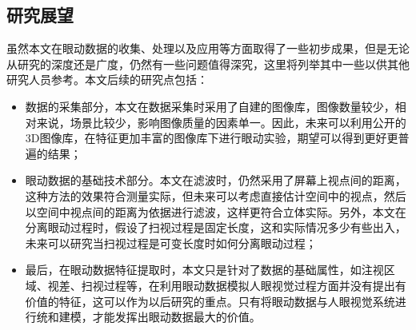 \begin{summary}
\section{研究展望}
虽然本文在眼动数据的收集、处理以及应用等方面取得了一些初步成果，但是无论从研究的深度还是广度，仍然有一些问题值得深究，这里将列举其中一些以供其他研究人员参考。本文后续的研究点包括：
\begin{itemize}[noitemsep,topsep=0pt,parsep=0pt,partopsep=0pt]
\item 数据的采集部分，本文在数据采集时采用了自建的图像库，图像数量较少，相对来说，场景比较少，影响图像质量的因素单一。因此，未来可以利用公开的3D图像库，在特征更加丰富的图像库下进行眼动实验，期望可以得到更好更普遍的结果；
\item 眼动数据的基础技术部分。本文在滤波时，仍然采用了屏幕上视点间的距离，这种方法的效果符合测量实际，但未来可以考虑直接估计空间中的视点，然后以空间中视点间的距离为依据进行滤波，这样更符合立体实际。另外，本文在分离眼动过程时，假设了扫视过程是固定长度，这和实际情况多少有些出入，未来可以研究当扫视过程是可变长度时如何分离眼动过程；
\item 最后，在眼动数据特征提取时，本文只是针对了数据的基础属性，如注视区域、视差、扫视过程等，在利用眼动数据模拟人眼视觉过程方面并没有提出有价值的特征，这可以作为以后研究的重点。只有将眼动数据与人眼视觉系统进行统和建模，才能发挥出眼动数据最大的价值。
\end{itemize}

\end{summary}
